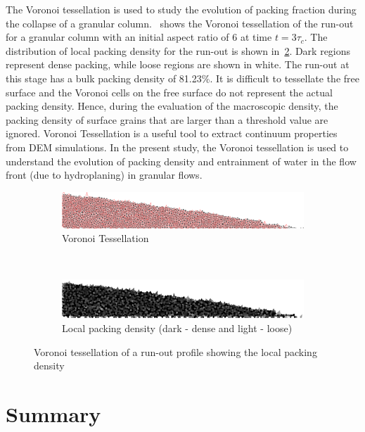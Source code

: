 The Voronoi tessellation is used to study the evolution of packing fraction 
during the collapse of a granular column.~ shows the 
Voronoi tessellation of the run-out for a granular column with an initial 
aspect ratio of 6 at time $t = 3 \tau_c$. The distribution of local packing 
density for the run-out is shown in~\cref{fig:local_density}. Dark regions 
represent dense packing, while loose regions are shown in white. The run-out at 
this stage has a bulk packing density of 81.23\%. It is difficult to tessellate 
the free surface and the Voronoi cells on the free surface do not represent the 
actual packing density. Hence, during the evaluation of the macroscopic 
density, the packing density of surface grains that are larger than a threshold 
value are ignored. Voronoi Tessellation is a useful tool to extract continuum 
properties from DEM simulations. In the present study, the Voronoi tessellation 
is used to understand the evolution of packing density and entrainment of water 
in the flow front (due to hydroplaning) in granular flows.

\begin{figure}[tbhp]

\begin{subfigure}[b]{0.95\textwidth}
\includegraphics[width=\textwidth]{tessellation}
\caption{Voronoi Tessellation}
\label{fig:tessellation}
\end{subfigure}
\\
\begin{subfigure}[b]{0.87\textwidth}

\includegraphics[width=\textwidth]{local_density}
\caption{Local packing density (dark - dense and light - loose)}
\label{fig:local_density}
\end{subfigure}
\caption{Voronoi tessellation of a run-out profile showing the local packing 
density}
\label{fig:voronoi_tesselation}
\end{figure}

\section{Summary}

